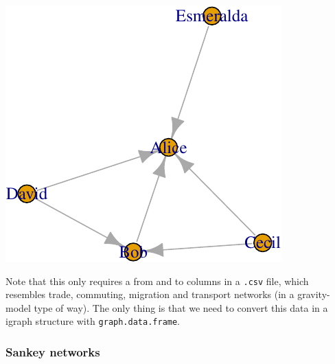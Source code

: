 \documentclass[]{article}
\theoremstyle{definition}
\theoremstyle{definition}
\theoremstyle{definition}
\theoremstyle{remark}
\begin{document}
\includegraphics{ResearchTools_files/figure-latex/unnamed-chunk-57-1.pdf}

Note that this only requires a from and to columns in a \texttt{.csv}
file, which resembles trade, commuting, migration and transport networks
(in a gravity-model type of way). The only thing is that we need to
convert this data in a igraph structure with \texttt{graph.data.frame}.

\subsubsection{Sankey networks}\label{sankey-networks}
\end{document}
